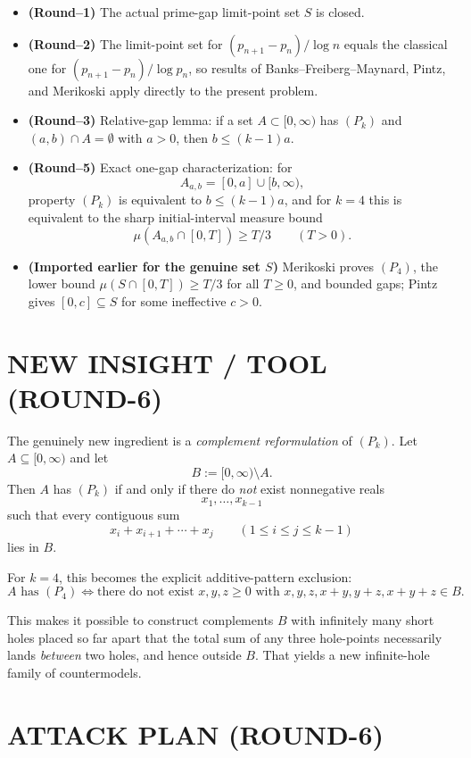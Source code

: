 \begin{itemize}
\item \textbf{(Round--1)} The actual prime-gap limit-point set $S$ is closed.
\item \textbf{(Round--2)} The limit-point set for $(p_{n+1}-p_n)/\log n$ equals the classical one for $(p_{n+1}-p_n)/\log p_n$, so results of Banks--Freiberg--Maynard, Pintz, and Merikoski apply directly to the present problem.
\item \textbf{(Round--3)} Relative-gap lemma: if a set $A\subset[0,\infty)$ has $(P_k)$ and $(a,b)\cap A=\emptyset$ with $a>0$, then $b\le (k-1)a$.
\item \textbf{(Round--5)} Exact one-gap characterization: for
\[
A_{a,b}=[0,a]\cup[b,\infty),
\]
property $(P_k)$ is equivalent to $b\le (k-1)a$, and for $k=4$ this is equivalent to the sharp initial-interval measure bound
\[
\mu(A_{a,b}\cap[0,T])\ge T/3\qquad (T>0).
\]
\item \textbf{(Imported earlier for the genuine set $S$)} Merikoski proves $(P_4)$, the lower bound $\mu(S\cap[0,T])\ge T/3$ for all $T\ge 0$, and bounded gaps; Pintz gives $[0,c]\subseteq S$ for some ineffective $c>0$.
\end{itemize}


\section{NEW INSIGHT / TOOL (ROUND-6)}

The genuinely new ingredient is a \emph{complement reformulation} of $(P_k)$.
Let $A\subseteq[0,\infty)$ and let
\[
B:=[0,\infty)\setminus A.
\]
Then $A$ has $(P_k)$ if and only if there do \emph{not} exist nonnegative reals
\[
 x_1,\dots,x_{k-1}
\]
such that every contiguous sum
\[
 x_i+x_{i+1}+\cdots+x_j\qquad (1\le i\le j\le k-1)
\]
lies in $B$.

For $k=4$, this becomes the explicit additive-pattern exclusion:
\[
A\text{ has }(P_4)
\iff
\text{there do not exist }x,y,z\ge 0\text{ with }x,y,z,x+y,y+z,x+y+z\in B.
\]

This makes it possible to construct complements $B$ with infinitely many short holes placed so far apart that the total sum of any three hole-points necessarily lands \emph{between} two holes, and hence outside $B$. That yields a new infinite-hole family of countermodels.


\section{ATTACK PLAN (ROUND-6)}

